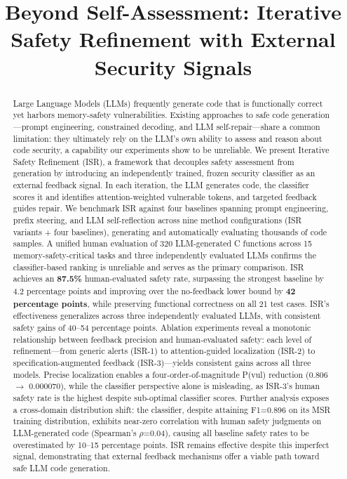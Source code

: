 \documentclass[10pt,conference]{IEEEtran}
\begin{document}
\title{Beyond Self-Assessment: Iterative Safety Refinement with External Security Signals}

\author{}
\maketitle

\begin{abstract}
Large Language Models (LLMs) frequently generate code that is functionally correct yet harbors memory-safety vulnerabilities. Existing approaches to safe code generation---prompt engineering, constrained decoding, and LLM self-repair---share a common limitation: they ultimately rely on the LLM's own ability to assess and reason about code security, a capability our experiments show to be unreliable. We present Iterative Safety Refinement (ISR), a framework that decouples safety assessment from generation by introducing an independently trained, frozen security classifier as an external feedback signal. In each iteration, the LLM generates code, the classifier scores it and identifies attention-weighted vulnerable tokens, and targeted feedback guides repair. We benchmark ISR against four baselines spanning prompt engineering, prefix steering, and LLM self-reflection across nine method configurations (ISR variants + four baselines), generating and automatically evaluating thousands of code samples. A unified human evaluation of 320 LLM-generated C functions across 15 memory-safety-critical tasks and three independently evaluated LLMs confirms the classifier-based ranking is unreliable and serves as the primary comparison. ISR achieves an \textbf{87.5\%} human-evaluated safety rate, surpassing the strongest baseline by 4.2 percentage points and improving over the no-feedback lower bound by \textbf{42 percentage points}, while preserving functional correctness on all 21 test cases. ISR's effectiveness generalizes across three independently evaluated LLMs, with consistent safety gains of 40--54 percentage points. Ablation experiments reveal a monotonic relationship between feedback precision and human-evaluated safety: each level of refinement---from generic alerts (ISR-1) to attention-guided localization (ISR-2) to specification-augmented feedback (ISR-3)---yields consistent gains across all three models. Precise localization enables a four-order-of-magnitude P(vul) reduction (0.806 $\rightarrow$ 0.000070), while the classifier perspective alone is misleading, as ISR-3's human safety rate is the highest despite sub-optimal classifier scores. Further analysis exposes a cross-domain distribution shift: the classifier, despite attaining F1=0.896 on its MSR training distribution, exhibits near-zero correlation with human safety judgments on LLM-generated code (Spearman's $\rho$=0.04), causing all baseline safety rates to be overestimated by 10--15 percentage points. ISR remains effective despite this imperfect signal, demonstrating that external feedback mechanisms offer a viable path toward safe LLM code generation.
\end{abstract}
\end{document}
